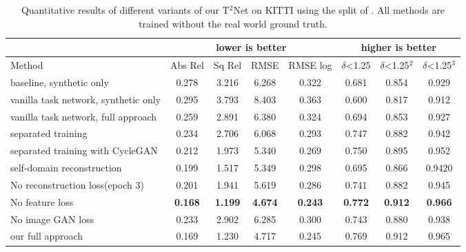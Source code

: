 \documentclass[runningheads]{llncs}
\begin{document}
\begin{table}[tb!]
	\begin{center}
		\scriptsize
		\renewcommand{\arraystretch}{1.4}
		\setlength{\arrayrulewidth}{1.0pt}
		\caption{Quantitative results of different variants of our T$^2$Net on KITTI using the split of \cite{eigen2014depth}. All methods are trained without the real world ground truth.}
		\begin{tabular}{|l|c|c|c|c|c|c|c|}
			\hline
			\multicolumn{1}{|c|}{} &  \multicolumn{4}{c|}{\cellcolor[rgb]{0.6,0.8,1.0} lower is better} &  \multicolumn{3}{c|}{\cellcolor[rgb]{0.0,0.8,1.0} higher is better} \\
			\hline
			Method & \cellcolor[rgb]{0.6,0.8,1.0} {\tiny Abs Rel} & \cellcolor[rgb]{0.6,0.8,1.0} {\tiny Sq Rel} & \cellcolor[rgb]{0.6,0.8,1.0} {\tiny RMSE} & \cellcolor[rgb]{0.6,0.8,1.0} {\tiny RMSE log} & \cellcolor[rgb]{0.0,0.8,1.0} {\tiny $\delta$<1.25} & \cellcolor[rgb]{0.0,0.8,1.0} {\tiny $\delta$<1.25$^2$}  & \cellcolor[rgb]{0.0,0.8,1.0} {\tiny $\delta$<1.25$^3$} \\
			\hline
			baseline, synthetic only & 0.278 & 3.216 & 6.268 & 0.322 & 0.681 & 0.854 & 0.929 \\
			vanilla task network, synthetic only & 0.295 & 3.793 & 8.403 & 0.363 & 0.600 & 0.817 & 0.912 \\
			vanilla task network, full approach & 0.259 & 2.891 & 6.380 & 0.324 & 0.694 & 0.853 & 0.927\\
			\hline
			separated training & 0.234 & 2.706 & 6.068 & 0.293 & 0.747 & 0.882 & 0.942 \\
			separated training with CycleGAN & 0.212 & 1.973 &  5.340 & 0.269 & 0.750 & 0.895 & 0.952\\
			self-domain reconstruction &  0.199 & 1.517 & 5.349 & 0.298 & 0.695 & 0.866 & 0.9420 \\
			\hline
			No reconstruction loss(epoch 3)& 0.201 & 1.941 & 5.619 & 0.286 & 0.741 & 0.882 & 0.945 \\
			No feature loss & {\bf 0.168} & {\bf 1.199} & {\bf 4.674} & {\bf 0.243} & {\bf 0.772} & {\bf 0.912}& {\bf 0.966}\\
			No image GAN loss & 0.233 & 2.902 & 6.285 & 0.300 & 0.743 & 0.880 & 0.938 \\
			\hline
			our full approach & 0.169 & 1.230 & 4.717& 0.245 & 0.769 &    0.912 &   0.965 \\
			\hline
		\end{tabular}
		\label{table:ablation}
	\end{center}
\end{table}
\end{document}
